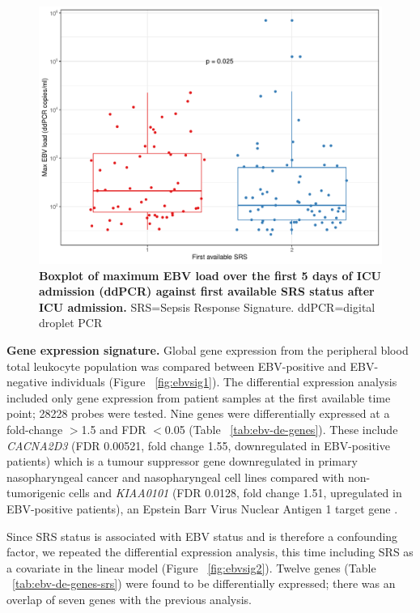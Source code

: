 \FloatBarrier
\begin{figure}[htbp]
\centering
\includegraphics[width=\textwidth]{./Results3/Images/ebvload.pdf}
\caption[EBV load and SRS status]{\textbf{Boxplot of maximum EBV load over the first 5 days of ICU admission (ddPCR) against first available SRS status after ICU admission.} SRS=Sepsis Response Signature. ddPCR=digital droplet PCR}
\label{fig:ebvload}


\end{figure}
\FloatBarrier

\textbf{Gene expression signature.} 
Global gene expression from the peripheral blood total leukocyte population was compared between EBV-positive and EBV-negative individuals (Figure ~\ref{fig:ebvsig1}). The differential expression analysis included only gene expression from patient samples at the first available time point; 28228 probes were tested. Nine genes were differentially expressed at a fold-change $>$1.5 and FDR $<$0.05 (Table ~\ref{tab:ebv-de-genes}). These include \textit{CACNA2D3} (FDR 0.00521, fold change 1.55, downregulated in EBV-positive patients) which is a tumour suppressor gene downregulated in primary nasopharyngeal cancer and nasopharyngeal cell lines compared with non-tumorigenic cells \parencite{Wong2013} and \textit{KIAA0101} (FDR 0.0128, fold change 1.51, upregulated in EBV-positive patients), an Epstein Barr Virus Nuclear Antigen 1 target gene \parencite{Satoh2013}.

Since SRS status is associated with EBV status and is therefore a confounding factor, we repeated the differential expression analysis, this time including SRS as a covariate in the linear model (Figure ~\ref{fig:ebvsig2}). Twelve genes (Table ~\ref{tab:ebv-de-genes-srs}) were found to be differentially expressed; there was an overlap of seven genes with the previous analysis.

